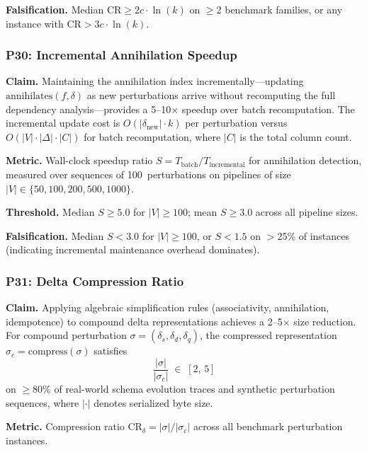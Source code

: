\documentclass[11pt,a4paper]{article}
\theoremstyle{definition}
\newcommand{\ann}{\mathrm{annihilates}}
\begin{document}
\textbf{Falsification.}  Median $\mathrm{CR} \geq 2 c \cdot \ln(k)$ on
$\geq$2 benchmark families, or any instance with
$\mathrm{CR} > 3 c \cdot \ln(k)$.

\subsubsection{P30: Incremental Annihilation Speedup}
\label{sec:p30}

\textbf{Claim.}
Maintaining the annihilation index incrementally---updating
$\ann(f, \delta)$ as new perturbations arrive without recomputing the full
dependency analysis---provides a 5--10$\times$ speedup over batch
recomputation.  The incremental update cost is
$O(|\delta_{\mathrm{new}}| \cdot k)$ per perturbation versus
$O(|V| \cdot |\Delta| \cdot |C|)$ for batch recomputation, where $|C|$ is
the total column count.

\textbf{Metric.}  Wall-clock speedup ratio
$S = T_{\mathrm{batch}} / T_{\mathrm{incremental}}$ for annihilation detection,
measured over sequences of 100~perturbations on pipelines of size
$|V| \in \{50, 100, 200, 500, 1000\}$.

\textbf{Threshold.}  Median $S \geq 5.0$ for $|V| \geq 100$; mean $S \geq 3.0$
across all pipeline sizes.

\textbf{Falsification.}  Median $S < 3.0$ for $|V| \geq 100$, or
$S < 1.5$ on $>$25\% of instances (indicating incremental maintenance overhead
dominates).

\subsubsection{P31: Delta Compression Ratio}
\label{sec:p31}

\textbf{Claim.}
Applying algebraic simplification rules (associativity, annihilation,
idempotence) to compound delta representations achieves a 2--5$\times$
size reduction.  For compound perturbation
$\sigma = (\delta_s, \delta_d, \delta_q)$, the compressed representation
$\sigma_c = \mathrm{compress}(\sigma)$ satisfies
\[
  \frac{|\sigma|}{|\sigma_c|} \;\in\; [2,\, 5]
\]
on $\geq$80\% of real-world schema evolution traces and synthetic perturbation
sequences, where $|\cdot|$ denotes serialized byte size.

\textbf{Metric.}  Compression ratio $\mathrm{CR}_\delta = |\sigma| / |\sigma_c|$
across all benchmark perturbation instances.
\end{document}
